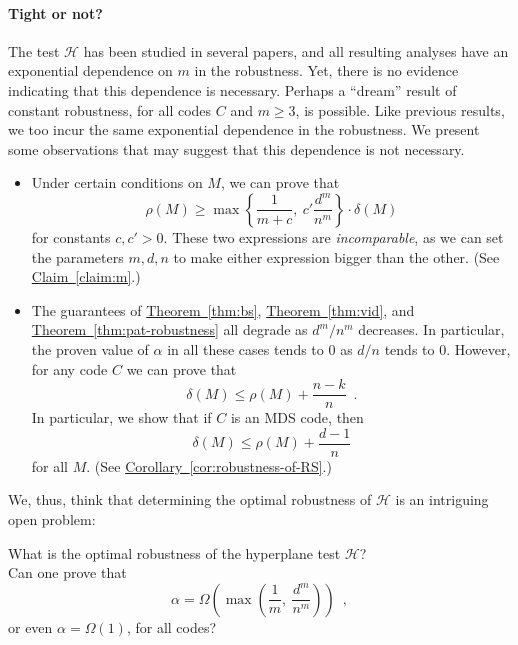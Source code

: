 \documentclass[11pt]{article}
\numberwithin{equation}{section}
\theoremstyle{definition}
\theoremstyle{plain}
\newcommand{\expref}[2]{\hyperref[#2]{#1~\ref{#2}}}
\theoremstyle{plain}
\newcommand{\colored}{}
\newcommand{\reldist}{\colored{\delta}}
\newcommand{\robust}{\colored{\rho}} %
\newcommand{\tester}{\colored{\mathcal H}} %
\newcommand{\codedist}{\colored{d}} %
\newcommand{\blocklength}{\colored{n}} %
\newcommand{\testerinput}{\colored{M}} %
\newcommand{\parhead}{\paragraph}
\begin{document}
%
%


\parhead{Tight or not?}
%
%
The test $\tester$ has been studied in several papers,          %
and all resulting analyses have an exponential dependence on $m$ in the robustness. Yet, there is no evidence indicating that this dependence is necessary. Perhaps a ``dream'' result of constant robustness, for all codes $C$ and $m \geq 3$, is possible. Like previous results, we too incur the same exponential dependence in the robustness. We present some observations that may suggest that this dependence is not necessary.


%
\begin{itemize}

\item Under certain conditions on $\testerinput$, we can prove that \[
    \robust(\testerinput) \geq \max\left\{\frac{1}{m + c},\ c' \frac{\codedist^m}{\blocklength^m}\right\} \cdot \reldist(\testerinput)
  \]
  for constants $c,c'>0$. These two expressions are
  \emph{incomparable}, as we can set the parameters
  $m,\codedist,\blocklength$ to make either expression bigger than the
  other. (See \expref{Claim}{claim:m}.)

\item The guarantees of \expref{Theorem}{thm:bs},
  \expref{Theorem}{thm:vid}, and \expref{Theorem}{thm:pat-robustness}
  all degrade as ${\codedist^m}/{\blocklength^m}$ decreases. In
  particular, the proven value of $\alpha$ in all these cases tends to
  $0$ as ${\codedist}/{\blocklength}$ tends to $0$. However, for
  any code $C$ we can prove that
  \[
    \reldist(\testerinput) \leq \robust(\testerinput) + \frac{\blocklength - k}{\blocklength}\enspace.
  \]
  In particular, we show that if $C$ is an MDS code, then
  \[
    \reldist(\testerinput) \leq \robust(\testerinput) + \frac{\codedist
      - 1}{\blocklength}
  \]
  for all $\testerinput$. (See
  \expref{Corollary}{cor:robustness-of-RS}.)

\end{itemize}
We, thus, think that determining the optimal robustness of $\tester$ is an intriguing open problem:
\begin{center}
\begin{minipage}{0.9\textwidth}
  What is the optimal robustness of the hyperplane test $\tester$? \\ Can one prove that
  \[
    \alpha = \Omega\left(\max\left(\frac{1}{m},\ \frac{\codedist^m}{\blocklength^m}\right)\right)\enspace,
  \]
  or even $\alpha = \Omega(1)$, for all codes?
\end{minipage}
\end{center}
\end{document}
